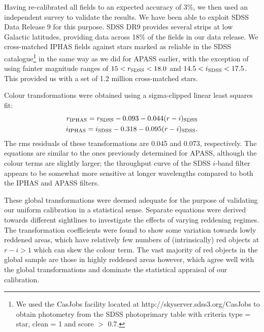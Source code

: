 \documentclass[useAMS,usenatbib]{mn2e}
\begin{document}
Having re-calibrated all fields to an expected accuracy of 3\%,
we then used an independent survey to validate the results.
We have been able to exploit SDSS Data Release 9 \citep{Ahn2012}
for this purpose.
SDSS DR9 provides several strips at low
Galactic latitudes,
providing data across 18\% of the fields in our data release.
We cross-matched IPHAS fields against 
stars marked as reliable in the SDSS catalogue\footnote{
We used the CasJobs facility located at http://skyserver.sdss3.org/CasJobs
to obtain photometry from the SDSS {\sc photoprimary} table 
with criteria {\sc type = star}, {\sc clean = 1} and {\sc score $>$ 0.7}.}
in the same way as we did for APASS earlier,
with the exception of using fainter magnitude ranges of 
$15<r_{\rm SDSS}<18.0$ and $14.5<i_{\rm SDSS}<17.5$.
This provided us with a set of 1.2 million cross-matched stars.

Colour transformations were obtained using a sigma-clipped linear least squares fit:
\begin{eqnarray}
r_{\rm IPHAS} = r_{\rm SDSS} - 0.093 - 0.044(r-i)_{\rm SDSS} \label{eqn:sdss_r} \\
i_{\rm IPHAS} = i_{\rm SDSS} - 0.318 - 0.095(r-i)_{\rm SDSS}. \label{eqn:sdss_i}
\end{eqnarray}
The rms residuals of these transformations are 0.045 and 0.073, respectively.
The equations are similar to the ones
previously determined for APASS,
although the colour terms are slightly larger;
the throughput curve of the SDSS $i$-band filter 
appears to be somewhat more sensitive at longer wavelengths
compared to both the IPHAS and APASS filters.

These global transformations were deemed adequate
for the purpose of validating our uniform calibration in a statistical sense.
Separate equations were derived towards different sightlines
to investigate the effects of varying reddening regimes.
The transformation coefficients were found 
to show some variation towards lowly reddened areas,
which have relatively few numbers
of (intrinsically) red objects at $r-i > 1$ 
which can skew the colour term.
The vast majority of red objects in the global sample
are those in highly reddened areas however,
which agree well with the global transformations
and dominate the statistical appraisal of our calibration.
\end{document}

